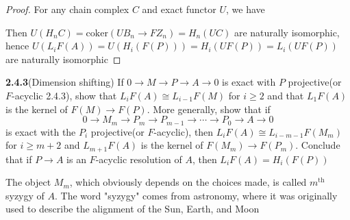 \documentclass[../main.tex]{subfiles}
\begin{document}
\begin{proof}
For any chain complex $C$ and exact functor $U$, we have
\begin{center}
\end{center}
Then $U(H_nC)=\mathrm{coker}(UB_n\to FZ_n)=H_n(UC)$ are naturally isomorphic, hence $U(L_iF(A))=U(H_i(F(P)))=H_i(UF(P))=L_i(UF(P))$ are naturally isomorphic
\end{proof}

\begin{customexercise}{\textbf{2.4.3}}(Dimension shifting)
If $0\to M\to P\to A\to0$ is exact with $P$ projective(or $F$-acyclic 2.4.3), show that $L_iF(A)\cong L_{i-1}F(M)$ for $i\geq2$ and that $L_1F(A)$ is the kernel of $F(M)\to F(P)$. More generally, show that if
\[0\to M_m\to P_m\to P_{m-1}\to\cdots\to P_0\to A\to0\]
is exact with the $P_i$ projective(or $F$-acyclic), then $L_iF(A)\cong L_{i-m-1}F(M_m)$ for $i\geq m+2$ and $L_{m+1}F(A)$ is the kernel of $F(M_m)\to F(P_m)$. Conclude that if $P\to A$ is an $F$-acyclic resolution of $A$, then $L_iF(A)=H_i(F(P))$
\end{customexercise}

\begin{remark}
The object $M_m$, which obviously depends on the choices made, is called $m^{\mathrm{th}}$ syzygy of $A$. The word "syzygy" comes from astronomy, where it was originally used to describe the alignment of the Sun, Earth, and Moon
\end{remark}
\end{document}
